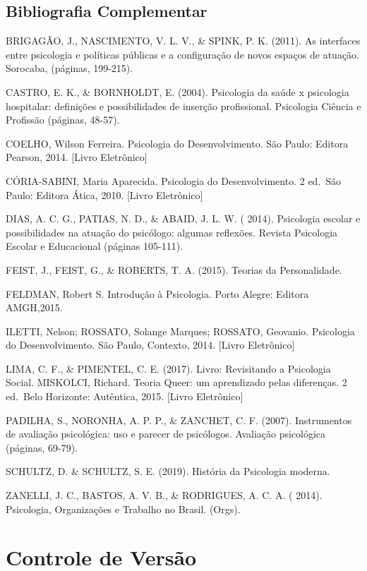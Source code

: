 \documentclass[
]{book}
\begin{document}
\hypertarget{bibliografia-complementar-1}{%
\subsection{Bibliografia Complementar}\label{bibliografia-complementar-1}}

BRIGAGÃO, J., NASCIMENTO, V. L. V., \& SPINK, P. K. (2011). As interfaces entre psicologia e políticas públicas e a configuração de novos espaços de atuação. Sorocaba, (páginas, 199-215).

CASTRO, E. K., \& BORNHOLDT, E. (2004). Psicologia da saúde x psicologia hospitalar: definições e possibilidades de inserção profissional. Psicologia Ciência e Profissão (páginas, 48-57).

COELHO, Wilson Ferreira. Psicologia do Desenvolvimento. São Paulo: Editora Pearson, 2014. {[}Livro Eletrônico{]}

CÓRIA-SABINI, Maria Aparecida. Psicologia do Desenvolvimento. 2 ed.~São Paulo: Editora Ática, 2010. {[}Livro Eletrônico{]}

DIAS, A. C. G., PATIAS, N. D., \& ABAID, J. L. W. ( 2014). Psicologia escolar e possibilidades na atuação do psicólogo: algumas reflexões. Revista Psicologia Escolar e Educacional (páginas 105-111).

FEIST, J., FEIST, G., \& ROBERTS, T. A. (2015). Teorias da Personalidade.

FELDMAN, Robert S. Introdução à Psicologia. Porto Alegre: Editora AMGH,2015.

ILETTI, Nelson; ROSSATO, Solange Marques; ROSSATO, Geovanio. Psicologia do Desenvolvimento. São Paulo, Contexto, 2014. {[}Livro Eletrônico{]}

LIMA, C. F., \& PIMENTEL, C. E. (2017). Livro: Revisitando a Psicologia Social. MISKOLCI, Richard. Teoria Queer: um aprendizado pelas diferenças. 2 ed.~Belo Horizonte: Autêntica, 2015. {[}Livro Eletrônico{]}

PADILHA, S., NORONHA, A. P. P., \& ZANCHET, C. F. (2007). Instrumentos de avaliação psicológica: uso e parecer de psicólogos. Avaliação psicológica (páginas, 69-79).

SCHULTZ, D. \& SCHULTZ, S. E. (2019). História da Psicologia moderna.

ZANELLI, J. C., BASTOS, A. V. B., \& RODRIGUES, A. C. A. ( 2014). Psicologia, Organizações e Trabalho no Brasil. (Orgs).

\hypertarget{controle-de-versuxe3o-1}{%
\section{Controle de Versão}\label{controle-de-versuxe3o-1}}
\end{document}
